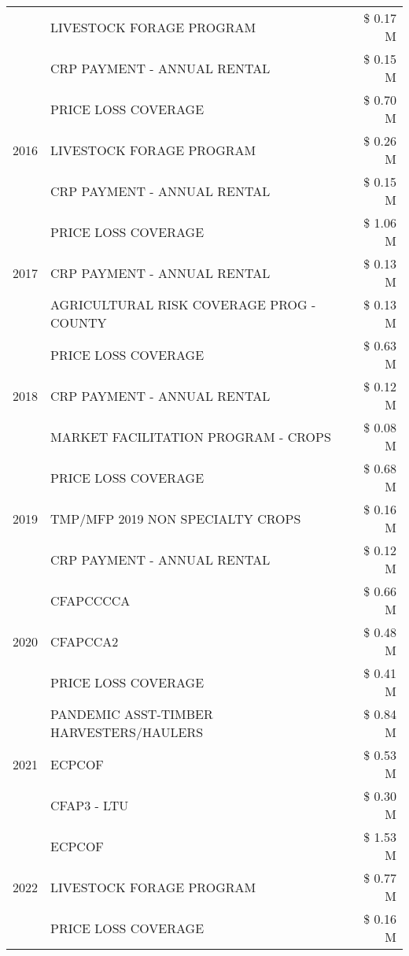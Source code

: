 \begin{tabular}{llr}
 & LIVESTOCK FORAGE PROGRAM & \$ 0.17 M \\
 & CRP PAYMENT - ANNUAL RENTAL & \$ 0.15 M \\
\cline{1-3}
\multirow[t]{3}{*}{2016} & PRICE LOSS COVERAGE & \$ 0.70 M \\
 & LIVESTOCK FORAGE PROGRAM & \$ 0.26 M \\
 & CRP PAYMENT - ANNUAL RENTAL & \$ 0.15 M \\
\cline{1-3}
\multirow[t]{3}{*}{2017} & PRICE LOSS COVERAGE & \$ 1.06 M \\
 & CRP PAYMENT - ANNUAL RENTAL & \$ 0.13 M \\
 & AGRICULTURAL RISK COVERAGE PROG - COUNTY & \$ 0.13 M \\
\cline{1-3}
\multirow[t]{3}{*}{2018} & PRICE LOSS COVERAGE & \$ 0.63 M \\
 & CRP PAYMENT - ANNUAL RENTAL & \$ 0.12 M \\
 & MARKET FACILITATION PROGRAM - CROPS & \$ 0.08 M \\
\cline{1-3}
\multirow[t]{3}{*}{2019} & PRICE LOSS COVERAGE & \$ 0.68 M \\
 & TMP/MFP 2019 NON SPECIALTY CROPS & \$ 0.16 M \\
 & CRP PAYMENT - ANNUAL RENTAL & \$ 0.12 M \\
\cline{1-3}
\multirow[t]{3}{*}{2020} & CFAPCCCCA & \$ 0.66 M \\
 & CFAPCCA2 & \$ 0.48 M \\
 & PRICE LOSS COVERAGE & \$ 0.41 M \\
\cline{1-3}
\multirow[t]{3}{*}{2021} & PANDEMIC ASST-TIMBER HARVESTERS/HAULERS & \$ 0.84 M \\
 & ECPCOF & \$ 0.53 M \\
 & CFAP3 - LTU & \$ 0.30 M \\
\cline{1-3}
\multirow[t]{3}{*}{2022} & ECPCOF & \$ 1.53 M \\
 & LIVESTOCK FORAGE PROGRAM & \$ 0.77 M \\
 & PRICE LOSS COVERAGE & \$ 0.16 M \\
\cline{1-3}
\bottomrule
\end{tabular}
